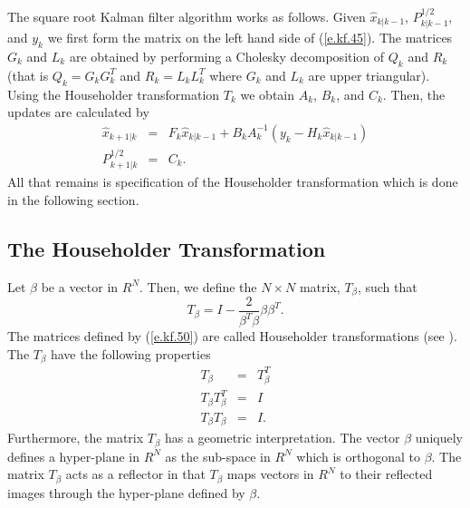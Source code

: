 	The square root Kalman filter algorithm
works as follows.  Given $\hat{x}_{k|k-1}$, $P_{k|k-1}^{1/2}$, and
$y_k$ we first form the matrix on the left hand side of (\ref{e.kf.45}).
The  matrices $G_k$ and $L_k$ are obtained by performing
a Cholesky decomposition of $Q_k$ and $R_k$ (that is $Q_k=G_kG_k^T$
and $R_k=L_kL_k^T$ where $G_k$ and $L_k$ are upper triangular).
Using the Householder transformation $T_k$ we obtain $A_k$, $B_k$,
and $C_k$.  Then, the updates are calculated by
%
\begin{eqnarray}
\hat{x}_{k+1|k}&=&F_k\hat{x}_{k|k-1}+B_kA_k^{-1}(y_k-H_k\hat{x}_{k|k-1})\nonumber\\
P_{k+1|k}^{1/2}&=&C_k.
\label{e.kf.51}
\end{eqnarray}
%
All that remains is specification of the Householder transformation
which is done in the following section.

\subsection{The Householder Transformation}

	Let $\beta$ be a vector in $R^N$.  Then, we
define the $N\times N$ matrix, $T_{\beta}$, such that
%
\begin{equation}
T_{\beta}=I-\frac{2}{\beta^T\beta}\beta\beta^T.
\label{e.kf.50a}
\end{equation}
%
The matrices defined by (\ref{e.kf.50}) are called Householder 
transformations (see \cite{Stewart}).
The $T_{\beta}$ have the following properties
%
\begin{eqnarray}
T_{\beta}&=&T_{\beta}^T\nonumber\\
T_{\beta}T_{\beta}^T&=&I\nonumber\\
T_{\beta}T_{\beta}&=&I.
\label{e.kf.51a}
\end{eqnarray}
%
Furthermore, the matrix $T_{\beta}$ has a geometric interpretation.
The vector $\beta$ uniquely defines a hyper-plane
in $R^N$ as the sub-space in $R^N$ which is orthogonal to $\beta$.
The matrix $T_{\beta}$ acts as a reflector in that $T_{\beta}$ maps
vectors in $R^N$ to their reflected images through the
hyper-plane defined by $\beta$.

